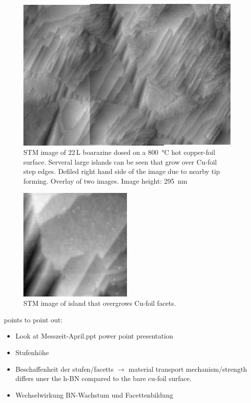 \begin{figure}
 \centering
 \includegraphics[width=\textwidth]{./images/150423-1008-1027}
 \caption{STM image of 22\,L boarazine dosed on a \SI{800}{\degreeCelsius} hot copper-foil surface. Serveral large islands can be seen that grow over Cu-foil step edges. Defiled right hand side of the image due to nearby tip forming. Overlay of two images. Image height: \SI{295}{\nm}}
\end{figure}

\begin{figure}
 \centering
 \includegraphics[width=0.5\textwidth]{./images/F150423-114214.jpg}
 \caption{STM image of island that overgrows Cu-foil facets.}
 \label{fig:23.04}
\end{figure}

points to point out:
\begin{itemize}
 \item Look at Messzeit-April.ppt power point presentation
 \item Stufenh\"ohe
 \item Beschaffenheit der stufen/facetts $\rightarrow$ material transport mechanism/strength differs uner the h-BN compared to the bare cu-foil surface.
 \item Wechselwirkung BN-Wachstum und Facettenbildung
\end{itemize}

